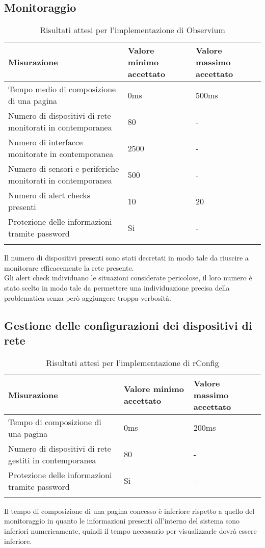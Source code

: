 \documentclass[Tesi.tex]{subfiles}
\begin{document}
\subsection{Monitoraggio}
\label{table:Risultati attesi per l'implementazione di Observium}
\renewcommand*{\arraystretch}{1.2}
\begin{longtable}[H]{p{8cm}p{2cm}p{2cm}}
	\rowcolor{CHeader}
	\color{CHeaderText} \textbf{Misurazione} & \color{CHeaderText} \textbf{Valore minimo accettato} & \color{CHeaderText} \textbf{Valore massimo accettato} \\
	\endhead
	Tempo medio di composizione di una pagina
	& 0ms & 500ms \\
	Numero di dispositivi di rete monitorati in contemporanea
	& 80 & - \\
	Numero di interfacce monitorate in contemporanea
	& 2500 & - \\
	Numero di sensori e periferiche monitorati in contemporanea
	& 500 & - \\
	Numero di alert checks presenti
	& 10 & 20 \\
	Protezione delle informazioni tramite password
	& Si & - \\
	\hiderowcolors
	\caption{Risultati attesi per l'implementazione di Observium}
\end{longtable}
Il numero di dispositivi presenti sono stati decretati in modo tale da riuscire a monitorare efficacemente la rete presente.\\
Gli alert check individuano le situazioni considerate pericolose, il loro numero è stato scelto in modo tale da permettere una individuazione precisa della problematica senza però aggiungere troppa verbosità.

\newpage
\subsection{Gestione delle configurazioni dei dispositivi di rete}
\label{table:Risultati attesi per l'implementazione di rConfig}
\renewcommand*{\arraystretch}{1.2}
\begin{longtable}[H]{p{8cm}p{2cm}p{2cm}}
	\rowcolor{CHeader}
	\color{CHeaderText} \textbf{Misurazione} & \color{CHeaderText} \textbf{Valore minimo accettato} & \color{CHeaderText} \textbf{Valore massimo accettato} \\
	\endhead
	Tempo di composizione di una pagina
	& 0ms & 200ms \\
	Numero di dispositivi di rete gestiti in contemporanea
	& 80 & - \\
	Protezione delle informazioni tramite password
	& Si & - \\
	\hiderowcolors
	\caption{Risultati attesi per l'implementazione di rConfig}
\end{longtable}
Il tempo di composizione di una pagina concesso è inferiore rispetto a quello del monitoraggio in quanto le informazioni presenti all'interno del sistema sono inferiori numericamente, quindi il tempo necessario per visualizzarle dovrà essere inferiore.
\end{document}
